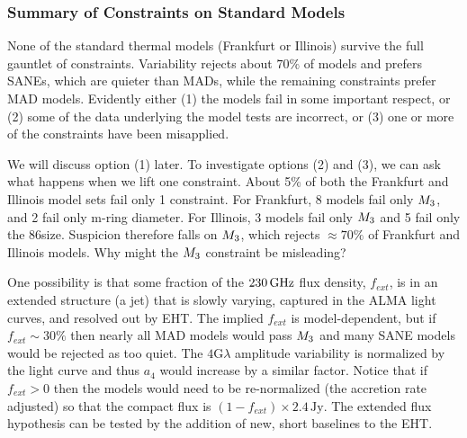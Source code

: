 
\subsubsection{Summary of Constraints on Standard Models}

None of the standard thermal models (Frankfurt or Illinois) survive the full gauntlet of constraints.   Variability rejects about $70\%$ of models and prefers SANEs, which are quieter than MADs, while the remaining constraints prefer MAD models.
Evidently either (1) the models fail in some important respect, or (2) some of the data underlying the model tests are incorrect, or (3) one or more of the constraints have been misapplied.

We will discuss option (1) later.  To investigate options (2) and (3), we can ask what happens when we lift one constraint.  About 5\% of both the Frankfurt and Illinois model sets fail only 1 constraint.  For Frankfurt, 8 models fail only $M_{3}$, and 2 fail only m-ring diameter.  For Illinois, 3 models fail only $M_{3}$ and 5 fail only the 86\GHz size.  Suspicion therefore falls on $M_{3}$, which rejects $\approx 70\%$ of Frankfurt and Illinois models.  Why might the $M_{3}$ constraint be misleading?

One possibility is that some fraction of the $230\,\mathrm{GHz}$ flux density, $f_{ext}$, is in an extended structure (a jet) that is slowly varying, captured in the ALMA light curves, and resolved out by EHT.  The implied $f_{ext}$ is model-dependent, but if $f_{ext} \sim 30\%$ then nearly all MAD models would pass $M_{3}$ and many SANE models would be rejected as too quiet.  The $4$G$\lambda$ amplitude variability is normalized by the light curve and thus $a_4$ would increase by a similar factor.  Notice that if $f_{ext} > 0$ then the models would need to be re-normalized (the accretion rate adjusted) so that the compact flux is $(1 - f_{ext}) \times 2.4\,\mathrm{Jy}$.  The extended flux hypothesis can be tested by the addition of new, short baselines to the EHT.

